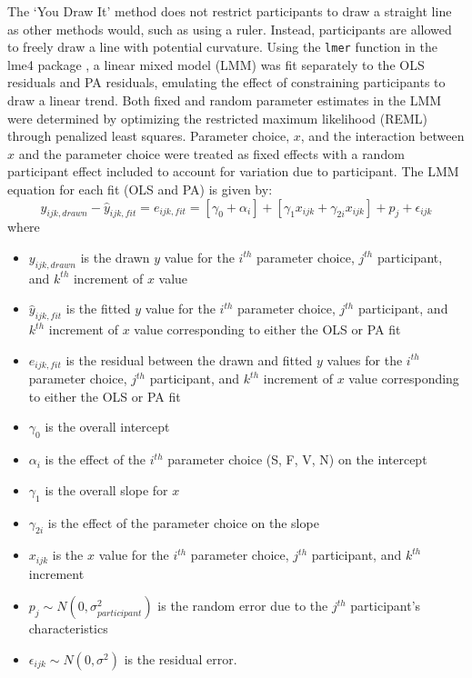\documentclass[12pt]{article}
\providecommand{\tightlist}{%
  \setlength{\itemsep}{0pt}\setlength{\parskip}{0pt}}
\begin{document}
The `You Draw It' method does not restrict participants to draw a
straight line as other methods would, such as using a ruler. Instead,
participants are allowed to freely draw a line with potential curvature.
Using the \texttt{lmer} function in the lme4 package \citep{lme4}, a
linear mixed model (LMM) was fit separately to the OLS residuals and PA
residuals, emulating the effect of constraining participants to draw a
linear trend. Both fixed and random parameter estimates in the LMM were
determined by optimizing the restricted maximum likelihood (REML)
through penalized least squares. Parameter choice, \(x\), and the
interaction between \(x\) and the parameter choice were treated as fixed
effects with a random participant effect included to account for
variation due to participant. The LMM equation for each fit (OLS and PA)
is given by: \begin{equation}
y_{ijk,drawn} - \hat y_{ijk,fit} = e_{ijk,fit} = \left[\gamma_0 + \alpha_i\right] + \left[\gamma_{1} x_{ijk} + \gamma_{2i} x_{ijk}\right] + p_{j} + \epsilon_{ijk}
\end{equation} \noindent where

\begin{itemize}
\tightlist
\item
  \(y_{ijk,drawn}\) is the drawn \(y\) value for the \(i^{th}\)
  parameter choice, \(j^{th}\) participant, and \(k^{th}\) increment of
  \(x\) value
\item
  \(\hat y_{ijk,fit}\) is the fitted \(y\) value for the \(i^{th}\)
  parameter choice, \(j^{th}\) participant, and \(k^{th}\) increment of
  \(x\) value corresponding to either the OLS or PA fit
\item
  \(e_{ijk,fit}\) is the residual between the drawn and fitted \(y\)
  values for the \(i^{th}\) parameter choice, \(j^{th}\) participant,
  and \(k^{th}\) increment of \(x\) value corresponding to either the
  OLS or PA fit
\item
  \(\gamma_0\) is the overall intercept
\item
  \(\alpha_i\) is the effect of the \(i^{th}\) parameter choice (S, F,
  V, N) on the intercept
\item
  \(\gamma_1\) is the overall slope for \(x\)
\item
  \(\gamma_{2i}\) is the effect of the parameter choice on the slope
\item
  \(x_{ijk}\) is the \(x\) value for the \(i^{th}\) parameter choice,
  \(j^{th}\) participant, and \(k^{th}\) increment
\item
  \(p_{j} \sim N(0, \sigma^2_{participant})\) is the random error due to
  the \(j^{th}\) participant's characteristics
\item
  \(\epsilon_{ijk} \sim N(0, \sigma^2)\) is the residual error.
\end{itemize}
\end{document}
